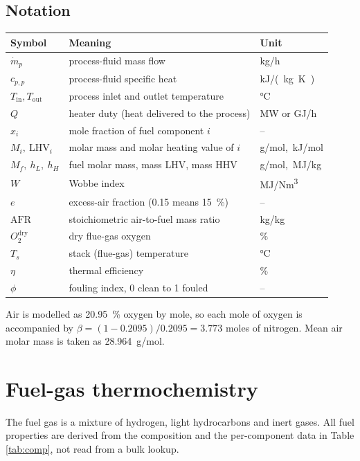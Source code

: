 \documentclass[11pt,a4paper]{article}
\begin{document}
\subsection{Notation}
\begin{table}[h]
\centering
\small
\begin{tabular}{@{}lll@{}}
\toprule
Symbol & Meaning & Unit\\
\midrule
$\dot m_p$ & process-fluid mass flow & \si{kg/h}\\
$c_{p,p}$ & process-fluid specific heat & \si{kJ/(kg.K)}\\
$T_\mathrm{in},T_\mathrm{out}$ & process inlet and outlet temperature & \si{\celsius}\\
$Q$ & heater duty (heat delivered to the process) & \si{MW} or \si{GJ/h}\\
$x_i$ & mole fraction of fuel component $i$ & --\\
$M_i,\ \mathrm{LHV}_i$ & molar mass and molar heating value of $i$ & \si{g/mol},\ \si{kJ/mol}\\
$M_f,\ h_L,\ h_H$ & fuel molar mass, mass LHV, mass HHV & \si{g/mol},\ \si{MJ/kg}\\
$W$ & Wobbe index & \si{MJ/Nm^3}\\
$e$ & excess-air fraction (0.15 means \SI{15}{\percent}) & --\\
$\mathrm{AFR}$ & stoichiometric air-to-fuel mass ratio & \si{kg/kg}\\
$O_2^\mathrm{dry}$ & dry flue-gas oxygen & \si{\percent}\\
$T_s$ & stack (flue-gas) temperature & \si{\celsius}\\
$\eta$ & thermal efficiency & \si{\percent}\\
$\phi$ & fouling index, 0 clean to 1 fouled & --\\
\bottomrule
\end{tabular}
\end{table}

Air is modelled as \SI{20.95}{\percent} oxygen by mole, so each mole of oxygen is
accompanied by $\beta=(1-0.2095)/0.2095=3.773$ moles of nitrogen. Mean air molar
mass is taken as \SI{28.964}{g/mol}.

\section{Fuel-gas thermochemistry}\label{sec:fuel}

The fuel gas is a mixture of hydrogen, light hydrocarbons and inert gases. All
fuel properties are derived from the composition and the per-component data in
Table \ref{tab:comp}, not read from a bulk lookup.
\end{document}

